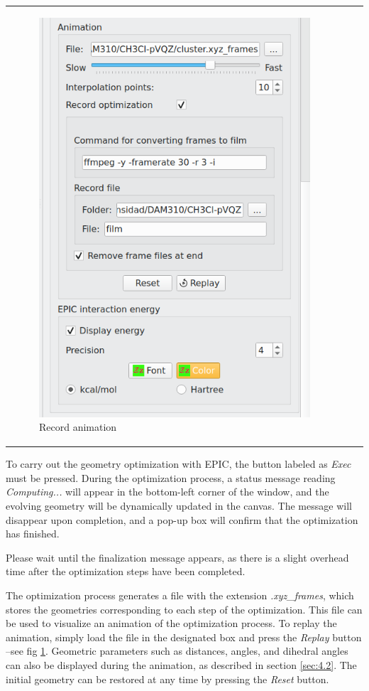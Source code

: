 \documentclass[10pt]{article}
\begin{document}
\begin{tabular}{lcr}
\begin{minipage}{.45\linewidth}
\begin{figure}[H]
\begin{center}
            \includegraphics[width=0.67\linewidth]{damqt320_mespimizer_6.png}
        \end{center}
        \caption{Record animation\label{fig:4_10_6}}
    \end{figure}
\end{minipage}
\end{tabular}

\vspace*{5mm}

To carry out the geometry optimization with EPIC, the button labeled as {\it Exec} must be pressed. During the optimization process,  
a status message reading {\it Computing...} will appear in the bottom-left corner of the window,  
and the evolving geometry will be dynamically updated in the canvas.  
The message will disappear upon completion, and a pop-up box will confirm that the optimization has finished.

\vspace*{5mm}{\bf Important:}\vspace*{5mm}  
Please wait until the finalization message appears, as there is a slight overhead time after the  
optimization steps have been completed.

The optimization process generates a file with the extension  
{\it .xyz\_frames}, which stores the geometries corresponding to each step of the  
optimization. This file can be used to visualize an animation of the optimization  
process. To replay the animation, simply load the file in the designated  
box and press the {\it Replay} button --see fig \ref{fig:4_10_6}.  
Geometric parameters such as distances, angles, and dihedral angles  
can also be displayed during the animation, as described in section \ref{sec:4.2}.  
The initial geometry can be restored at any time by pressing the {\it Reset} button.
\end{document}
